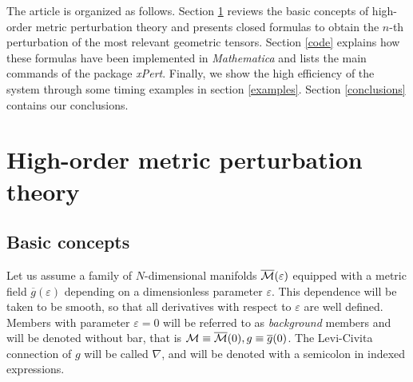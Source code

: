 \documentclass[aps,prd,showpacs]{revtex4}
\newcommand{\xPert}{{\em \lowercase{x}P\lowercase{ert}}}
\begin{document}
The article is organized as follows. Section \ref{theory} reviews
the basic concepts of high-order metric perturbation theory and
presents closed formulas to obtain the $n$-th perturbation of
the most relevant geometric tensors. 
Section \ref{code} explains how these formulas have been implemented
in {\em Mathematica} and lists the main commands of the package \xPert.
Finally, we show the high efficiency of the system through some timing
examples in section \ref{examples}. Section \ref{conclusions}
contains our conclusions.

\section{High-order metric perturbation theory}\label{theory}

\subsection{Basic concepts}

Let us assume a family of $N$-dimensional manifolds
$\overline{\cal M}(\varepsilon)$ equipped with a metric field
$\overline{g}(\varepsilon)$ depending on a dimensionless parameter
$\varepsilon$. This dependence will be taken to be smooth,
so that all derivatives with respect to $\varepsilon$ are well defined.
Members with parameter $\varepsilon=0$ will be referred to as
{\em background} members and will be denoted without bar,
that is ${\cal M}\equiv \overline{\cal M}(0), g\equiv \overline g(0)$.
The Levi-Civita connection of $g$ will be called $\nabla$, and
will be denoted with a semicolon in indexed expressions.
\end{document}
